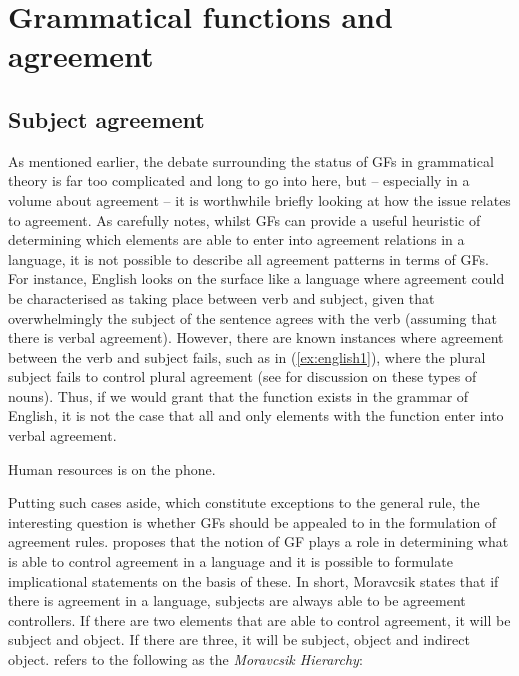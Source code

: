 \documentclass[output=paper
,modfonts
,nonflat]{langsci/langscibook}
\begin{document}
\section{Grammatical functions and agreement}\label{gfagr}
\subsection{Subject agreement}
As mentioned earlier, the debate surrounding the status of GFs in grammatical theory is far too complicated and long to go into here, but -- especially in a volume about agreement -- it is worthwhile briefly looking at how the issue relates to agreement.
As \citet{corbett2012gr} carefully notes, whilst GFs can provide a useful heuristic of determining which elements are able to enter into agreement relations in a language, it is not possible to describe all agreement patterns in terms of GFs.
For instance, English looks on the surface like a language where agreement could be characterised as taking place between verb and subject, given that overwhelmingly the subject of the sentence agrees with the verb (assuming that there is verbal agreement).
However, there are known instances where agreement between the verb and subject fails, such as in (\ref{ex:english1}), where the plural subject fails to control plural agreement (see \citealt{pollardsag1994} for discussion on these types of nouns).
Thus, if we would grant that the \subj{} function exists in the grammar of English, it is not the case that all and only elements with the \subj{} function enter into verbal agreement.

\begin{exe}
\ex \label{ex:english1}
Human resources is on the phone.
\end{exe}

\noindent Putting such cases aside, which constitute exceptions to the general rule, the interesting question is whether GFs should be appealed to in the formulation of agreement rules.
\citet{Moravcsik1974,moravcsik1978} proposes that the notion of GF plays a role in determining what is able to control agreement in a language and it is possible to formulate implicational statements on the basis of these.
In short, Moravcsik states that if there is agreement in a language, subjects are always able to be agreement controllers.
If there are two elements that are able to control agreement, it will be subject and object.
If there are three, it will be subject, object and indirect object.
\citet{Bobaljik2008} refers to the following as the \textit{Moravcsik Hierarchy}:
\end{document}
